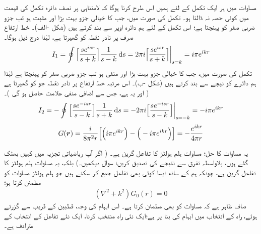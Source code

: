 مساوات  میں ہر ایک تکمل کے لئے ہمیں اس طرح  کرنا ہوگا کہ لامتناہی پر نصف دائرہ تکمل کی قیمت میں کوئی حصہ نہ ڈالتا ہو۔ تکمل  کی صورت میں، جب  کا خیالی جزو بہت بڑا اور مثبت ہو تب جزو ضربی  صفر کو پہنچتا ہے؛ اس تکمل کے لئے ہم دائرہ اوپر سے بند کرتے ہیں (شکل -الف)۔ خط ارتفاع صرف  پر نادر نقطہ کو گھیرتا ہے، لہٰذا درج ذیل ہوگا۔
\begin{align}\label{مساوات_بکھراو_آئی_الف}
	I_1 = \oint\Big[\frac{se^{isr}}{s+k}\Big]\frac{1}{s-k}\dif s = 2\pi i\Big[\frac{se^{isr}}{s+k}\Big]\bigg|_{s=k} = i\pi e^{ikr}
\end{align}
تکمل  کی صورت میں، جب  کا خیالی جزو بہت بڑا اور منفی ہو تب جزو ضربی  صفر کو پہنچتا ہے لہٰذا ہم دائرے کو نیچے سے بند کرتے ہیں (شکل -ب)۔ اس مرتبہ خط ارتفاع  پر نادر نقطہ جو کو گھیرتا ہے ( اور یہ  ہے، جس سے اضافی منفی علامت حاصل ہو گی )۔
\begin{align}\label{مساوات_بکھراو_آئی_ب}
	I_2 = -\oint\Big[\frac{se^{-isr}}{s-k}\Big]\frac{1}{s+k}\dif s = -2\pi i\Big[\frac{se^{-isr}}{s-k}\Big]\bigg|_{s=-k} = -i\pi e^{ikr}
\end{align}
\begin{align}\label{مساوات_بکھراو_مشکل_نتیجہ}
	G({{\boldsymbol{r}}}) = \frac{i}{8\pi^2r}\Big[\Big(i\pi e^{ikr}\Big)-\Big(-i\pi e^{ikr}\Big)\Big] = -\frac{e^{ikr}}{4\pi r}
\end{align}

یہ مساوات  کا حل؛ مساوات ہلم ہولٹز کا تفاعل گرین ہے۔ ( اگر آپ ریاضیاتی تجزیہ میں کہیں بھٹک گئے ہوں، بلاواسطہ تفرق سے نتیجے کی تصدیق کریں؛ 
 سوال  دیکھیں۔) بلکہ، یہ مساوات ہلم ہولٹز کا تفاعل گرین ہے، چونکہ ہم  کے ساتھ ایسا کوئی بھی تفاعل  جمع کر سکتے ہیں جو  ہلم ہولٹز مساوات کو مطمئن کرتا ہو؛
\begin{align}
	(\nabla^2+k^2)G_0(r) = 0
\end{align}
 صاف ظاہر ہے کہ مساوات  کو  بھی مطمئن کرتا ہے۔ اس ابہام کی وجہ، قطبین کے قریب سے گزرتے ہوئے، راہ کے انتخاب میں ابہام کی بنا پر ہے؛ایک نئی راہ منتخب کرنا، ایک نئے تفاعل  کے انتخاب کے مترادف ہے۔

